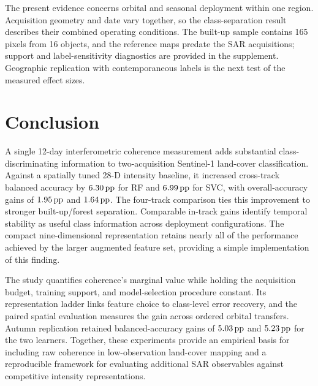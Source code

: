 The present evidence concerns orbital and seasonal deployment within one region. Acquisition geometry and date vary together, so the class-separation result describes their combined operating conditions. The built-up sample contains 165 pixels from 16 objects, and the reference maps predate the SAR acquisitions; support and label-sensitivity diagnostics are provided in the supplement. Geographic replication with contemporaneous labels is the next test of the measured effect sizes.

\section{Conclusion}

A single 12-day interferometric coherence measurement adds substantial class-discriminating information to two-acquisition Sentinel-1 land-cover classification. Against a spatially tuned 28-D intensity baseline, it increased cross-track balanced accuracy by $6.30\,\mathrm{pp}$ for RF and $6.99\,\mathrm{pp}$ for SVC, with overall-accuracy gains of $1.95\,\mathrm{pp}$ and $1.64\,\mathrm{pp}$. The four-track comparison ties this improvement to stronger built-up/forest separation. Comparable in-track gains identify temporal stability as useful class information across deployment configurations. The compact nine-dimensional representation retains nearly all of the performance achieved by the larger augmented feature set, providing a simple implementation of this finding.

The study quantifies coherence's marginal value while holding the acquisition budget, training support, and model-selection procedure constant. Its representation ladder links feature choice to class-level error recovery, and the paired spatial evaluation measures the gain across ordered orbital transfers. Autumn replication retained balanced-accuracy gains of $5.03\,\mathrm{pp}$ and $5.23\,\mathrm{pp}$ for the two learners. Together, these experiments provide an empirical basis for including raw coherence in low-observation land-cover mapping and a reproducible framework for evaluating additional SAR observables against competitive intensity representations.

